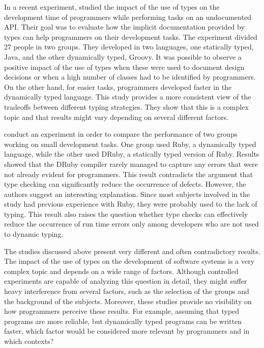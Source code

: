 \documentclass[msc]{ppgccufmg}
\begin{document}
In a recent experiment, \cite{Hanenberg13} studied the impact of the use of types on the development time of programmers while performing tasks on an undocumented API.
Their goal was to evaluate how the implicit documentation provided by types can help programmers on their development tasks.
The experiment divided 27 people in two groups.
They developed in two languages, one statically typed, Java, and the other dynamically typed, Groovy.
It was possible to observe a positive impact of the use of types when these were used to document design decisions or when a high number of classes had to be identified by programmers.
On the other hand, for easier tasks, programmers developed faster in the dynamically typed language.
This study provides a more consistent view of the tradeoffs between different typing strategies.
They show that this is a complex topic and that results might vary depending on several different factors.

\cite{ruby_vs_druby} conduct an experiment in order to compare the performance of two groups working on small development tasks.
One group used Ruby, a dynamically typed language, while the other used DRuby, a statically typed version of Ruby. 
Results showed that the DRuby compiler rarely managed to capture any errors that were not already evident for programmers.
This result contradicts the argument that type checking can significantly reduce the occurrence of defects.
However, the authors suggest an interesting explanation.
Since most subjects involved in the study had previous experience with Ruby, they were probably used to the lack of typing.
This result also raises the question whether type checks can effectively reduce the occurrence of run time errors only among developers who are not used to dynamic typing.

The studies discussed above present very different and often contradictory results.
The impact of the use of types on the development of software systems is a very complex topic and depends on a wide range of factors.
Although controlled experiments are capable of analyzing this question in detail, they might suffer heavy interference from several factors, such as the selection of the groups and the background of the subjects.
Moreover, these studies provide no visibility on how programmers perceive these results.
For example, assuming that typed programs are more reliable, but dynamically typed programs can be written faster, which factor would be considered more relevant by programmers and in which contexts?
\end{document}
